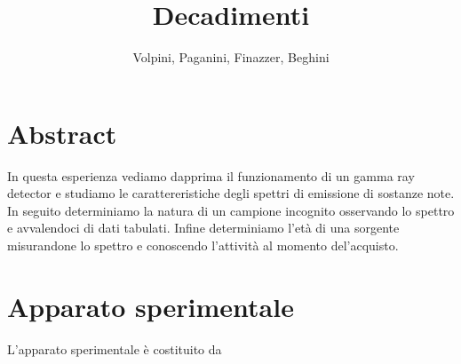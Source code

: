 \documentclass[11pt,a4paper]{article}
\author{Volpini, Paganini, Finazzer, Beghini}
\title{Decadimenti}
\begin{document}
\maketitle
\section{Abstract}
In questa esperienza vediamo dapprima il funzionamento di un gamma ray detector e studiamo le carattereristiche degli spettri di emissione di sostanze note. In seguito determiniamo la natura di un campione incognito osservando lo spettro e avvalendoci di dati tabulati. Infine determiniamo l'età di una sorgente misurandone lo spettro e conoscendo l'attività al momento del'acquisto.
\section{Apparato sperimentale}
L'apparato sperimentale è costituito da
\end{document}
